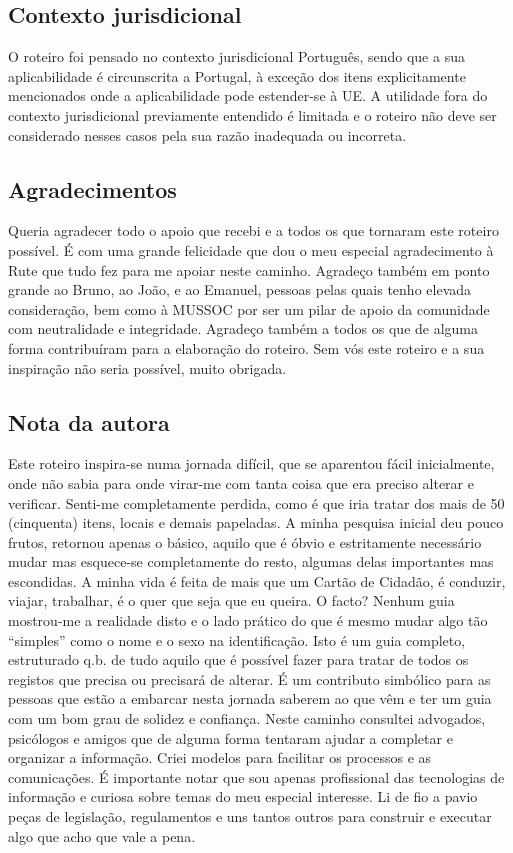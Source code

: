 \subsection{Contexto jurisdicional}

O roteiro foi pensado no contexto jurisdicional Português, sendo que a
sua aplicabilidade é circunscrita a Portugal, à exceção dos itens
explicitamente mencionados onde a aplicabilidade pode estender-se à UE.
A utilidade fora do contexto jurisdicional previamente entendido é
limitada e o roteiro não deve ser considerado nesses casos pela sua
razão inadequada ou incorreta.

\subsection{Agradecimentos}

Queria agradecer todo o apoio que recebi e a todos os que tornaram este
roteiro possível. É com uma grande felicidade que dou o meu especial
agradecimento à Rute que tudo fez para me apoiar neste caminho. Agradeço
também em ponto grande ao Bruno, ao João, e ao Emanuel, pessoas pelas
quais tenho elevada consideração, bem como à MUSSOC por ser um pilar de
apoio da comunidade com neutralidade e integridade. Agradeço também a
todos os que de alguma forma contribuíram para a elaboração do roteiro.
Sem vós este roteiro e a sua inspiração não seria possível, muito
obrigada.

\newpage

\subsection{Nota da autora}

Este roteiro inspira-se numa jornada difícil, que se aparentou fácil
inicialmente, onde não sabia para onde virar-me com tanta coisa que era
preciso alterar e verificar. Senti-me completamente perdida, como é que
iria tratar dos mais de 50 (cinquenta) itens, locais e demais papeladas.
A minha pesquisa inicial deu pouco frutos, retornou apenas o básico,
aquilo que é óbvio e estritamente necessário mudar mas esquece-se
completamente do resto, algumas delas importantes mas escondidas. A
minha vida é feita de mais que um Cartão de Cidadão, é conduzir, viajar,
trabalhar, é o quer que seja que eu queira. O facto? Nenhum guia
mostrou-me a realidade disto e o lado prático do que é mesmo mudar algo
tão ``simples'' como o nome e o sexo na identificação. Isto é um guia
completo, estruturado q.b. de tudo aquilo que é possível fazer para
tratar de todos os registos que precisa ou precisará de alterar. É um
contributo simbólico para as pessoas que estão a embarcar nesta jornada
saberem ao que vêm e ter um guia com um bom grau de solidez e confiança.
Neste caminho consultei advogados, psicólogos e amigos que de alguma
forma tentaram ajudar a completar e organizar a informação. Criei
modelos para facilitar os processos e as comunicações. É importante
notar que sou apenas profissional das tecnologias de informação e
curiosa sobre temas do meu especial interesse. Li de fio a pavio peças
de legislação, regulamentos e uns tantos outros para construir e
executar algo que acho que vale a pena.

